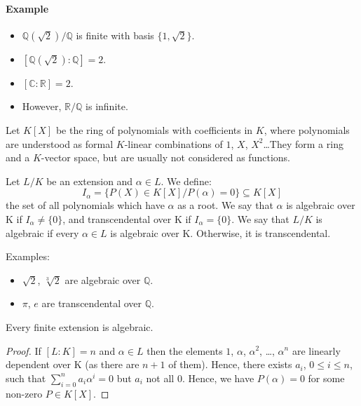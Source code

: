 \paragraph{Example}
\begin{itemize}
  \item $\mathbb{Q}(\sqrt{2})/\mathbb{Q}$ is finite with basis $\{1, \sqrt{2}\}$.
  \item $[\mathbb{Q}(\sqrt{2}) : \mathbb{Q}] = 2$.
  \item $[\mathbb{C} : \mathbb{R}] = 2$.
  \item However, $\mathbb{R}/\mathbb{Q}$ is infinite.
\end{itemize}

Let $K[X]$ be the ring of polynomials with coefficients in $K$, where polynomials are understood as formal $K$-linear combinations of $1$, $X$, $X^2$\ldots They form a ring and a $K$-vector space, but are usually not considered as functions.

\begin{definition} \label{def:3}
  Let $L/K$ be an extension and $\alpha \in L$. We define:
  \begin{equation*}
    I_\alpha = \{ P(X) \in K[X] / P(\alpha) = 0\} \subseteq K[X]
  \end{equation*}
  the set of all polynomials which have $\alpha$ as a root. We say that $\alpha$ is algebraic over K if $I_\alpha \neq \{0\}$, and transcendental over K if $I_\alpha = \{0\}$. We say that $L/K$ is algebraic if every $\alpha \in L$ is algebraic over K. Otherwise, it is transcendental.
\end{definition}
Examples:
\begin{itemize}
  \item $\sqrt{2}$, $\sqrt[3]{2}$ are algebraic over $\mathbb{Q}$.
  \item $\pi$, $e$ are transcendental over $\mathbb{Q}$.
\end{itemize}

\begin{proposition} \label{prop:4}
Every finite extension is algebraic.
\end{proposition}
\begin{proof}
  If $[L : K] = n$ and $\alpha \in L$ then the elements $1$, $\alpha$, $\alpha^2$, \ldots , $\alpha^n$ are linearly dependent over K (as there are $n+1$ of them). Hence, there exists $a_i$, $0 \leq i \leq n$, such that $\sum_{i=0}^n a_i\alpha^i=0$ but $a_i$ not all $0$. Hence, we have $P(\alpha) = 0$ for some non-zero $P \in K[X]$.
\end{proof}

